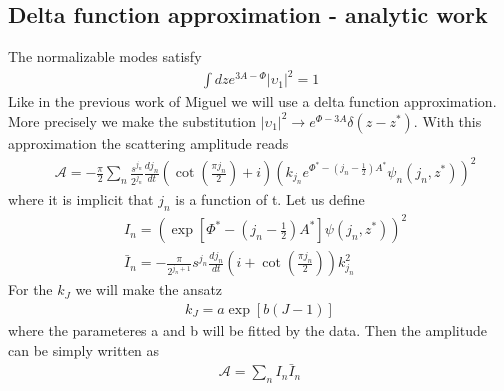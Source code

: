 \documentclass[12pt,a4paper]{article}
\begin{document}
\subsection{Delta function approximation - analytic work}
The normalizable modes satisfy
\begin{align}
    \int dz e^{3 A - \Phi} {|\upsilon_1|}^2 = 1
\end{align}
Like in the previous work of Miguel we will use a delta function approximation.
More precisely we make the substitution ${|\upsilon_1|}^2 \rightarrow e^{\Phi - 3 A} \delta \left( z - z^{*} \right)$.
With this approximation the scattering amplitude reads
\begin{align}
    & \mathcal{A} = - \frac{\pi}{2} \sum_n \frac{s^{j_n}}{2^{j_n}} \frac{d j_n}{d t}\left( \cot\left(\frac{\pi j_n}{2}\right) + i\right) {\left(k_{j_n} e^{\Phi^{*}-\left( j_n - \frac{1}{2} \right)A^{*}} \psi_n \left(j_n, z^{*} \right)\right)}^2
\end{align}
where it is implicit that $j_n$ is a function of t. Let us define
\begin{align}
    & I_n = {\left( \exp\left[\Phi^{*} - \left( j_n - \frac{1}{2} \right) A^{*}\right] \psi \left(j_n, z^{*} \right) \right)}^2 \\
    & \bar{I}_n = - \frac{\pi}{2^{j_n + 1}} s^{j_n} \frac{d j_n}{dt} \left( i + \cot \left( \frac{\pi j_n}{2} \right) \right) k_{j_n}^2
\end{align}
For the $k_J$ we will make the ansatz
\begin{align}
    k_J = a \exp \left[b \left(J - 1 \right)\right]
\end{align}
where the parameteres a and b will be fitted by the data.
Then the amplitude can be simply written as
\begin{align}
    \mathcal{A} = \sum_n I_n \bar{I}_n
\end{align}
\end{document}
